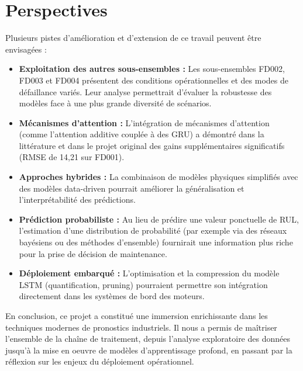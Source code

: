 \documentclass[12pt,a4paper]{report}
\theoremstyle{definition}
\begin{document}
\section*{Perspectives}

Plusieurs pistes d'amélioration et d'extension de ce travail peuvent être envisagées :

\begin{itemize}
    \item \textbf{Exploitation des autres sous-ensembles :} Les sous-ensembles FD002, FD003 et FD004 présentent des conditions opérationnelles et des modes de défaillance variés. Leur analyse permettrait d'évaluer la robustesse des modèles face à une plus grande diversité de scénarios.
    
    \item \textbf{Mécanismes d'attention :} L'intégration de mécanismes d'attention (comme l'attention additive couplée à des GRU) a démontré dans la littérature et dans le projet original des gains supplémentaires significatifs (RMSE de 14,21 sur FD001).
    
    \item \textbf{Approches hybrides :} La combinaison de modèles physiques simplifiés avec des modèles data-driven pourrait améliorer la généralisation et l'interprétabilité des prédictions.
    
    \item \textbf{Prédiction probabiliste :} Au lieu de prédire une valeur ponctuelle de RUL, l'estimation d'une distribution de probabilité (par exemple via des réseaux bayésiens ou des méthodes d'ensemble) fournirait une information plus riche pour la prise de décision de maintenance.
    
    \item \textbf{Déploiement embarqué :} L'optimisation et la compression du modèle LSTM (quantification, pruning) pourraient permettre son intégration directement dans les systèmes de bord des moteurs.
\end{itemize}

En conclusion, ce projet a constitué une immersion enrichissante dans les techniques modernes de pronostics industriels. Il nous a permis de maîtriser l'ensemble de la chaîne de traitement, depuis l'analyse exploratoire des données jusqu'à la mise en oeuvre de modèles d'apprentissage profond, en passant par la réflexion sur les enjeux du déploiement opérationnel.
\end{document}
